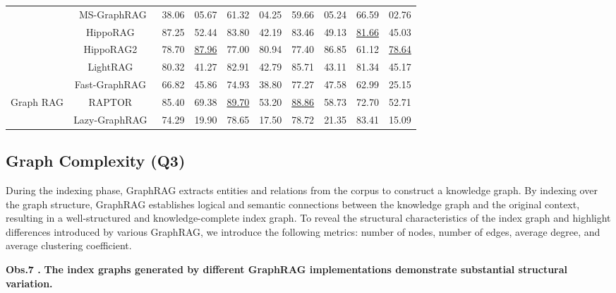 \documentclass{article} %
\begin{document}
\begin{table}[!t]
{\begin{tabular}{c|c|cc|cc|cc|cc}
\midrule
 & MS-GraphRAG \citep{edge2024local} & 38.06 & 05.67 & 61.32 & 04.25 & 59.66 & 05.24 & 66.59 & 02.76 \\
 & HippoRAG~\citep{HippoRAG} & 87.25 & 52.44 & 83.80 & 42.19 & 83.46 & 49.13 & \underline{81.66} & 45.03 \\
 & HippoRAG2~\citep{gutiérrez2025HippoRAG2} & 78.70 & \underline{87.96} & 77.00 & 80.94 & 77.40 & 86.85 & 61.12 & \underline{78.64} \\
 & LightRAG~\citep{guo2024lightrag} & 80.32 & 41.27 & 82.91 & 42.79 & 85.71 & 43.11 & 81.34 & 45.17 \\
 & Fast-GraphRAG~\citep{fastgraphrag2024} & 66.82 & 45.86 & 74.93 & 38.80 & 77.27 & 47.58 & 62.99 & 25.15 \\
\multirow{-7}{*}{Graph RAG} & RAPTOR~\citep{sarthi2024raptor} & 85.40 & 69.38 & \underline{89.70} & 53.20 & \underline{88.86} & 58.73 & 72.70 & 52.71 \\
& Lazy-GraphRAG~\citep{LazyGraphRAG} & 74.29 & 19.90 & 78.65 & 17.50 & 78.72 & 21.35 & 83.41 & 15.09 \\
\bottomrule

\end{tabular}

}
\label{tab:main-retrieval}
\end{table}



\subsection{Graph Complexity (Q3)}



During the indexing phase, GraphRAG extracts entities and relations from the corpus to construct a knowledge graph. By indexing over the graph structure, GraphRAG establishes logical and semantic connections between the knowledge graph and the original context, resulting in a well-structured and knowledge-complete index graph. To reveal the structural characteristics of the index graph and highlight differences introduced by various GraphRAG, we introduce the following metrics: number of nodes, number of edges, average degree, and average clustering coefficient.

\textbf{Obs.7 .} \textbf{The index graphs generated by different GraphRAG implementations demonstrate substantial structural variation.} 
\end{document}
